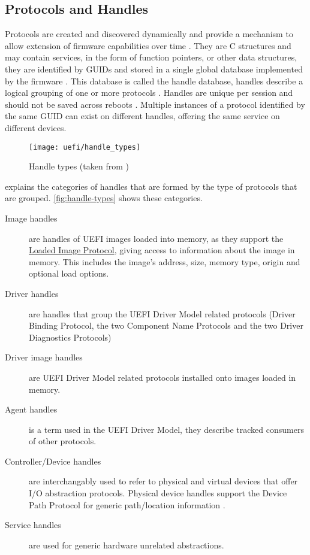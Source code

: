 \subsection{Protocols and Handles}

Protocols are created and discovered dynamically and provide a mechanism to allow extension of firmware capabilities over time \cite[Section 3.6]{tianocore-edk2-driver-writer-s-guide}.
They are C structures and may contain services, in the form of function pointers, or other data structures, they are identified by \acp{GUID} and stored in a single global database implemented by the firmware \cite{beyond-bios}.
This database is called the handle database, handles describe a logical grouping of one or more protocols \cite[Section 3.6]{tianocore-edk2-driver-writer-s-guide}.
Handles are unique per session and should not be saved across reboots \cite{beyond-bios}.
Multiple instances of a protocol identified by the same \ac{GUID} can exist on different handles, offering the same service on different devices.

\begin{figure}[htb]%
    \centering%
    \texttt{[image: uefi/handle\_types]}%
    \caption{Handle types (taken from \cite[Figure 3]{tianocore-edk2-driver-writer-s-guide})}%
    \label{fig:handle-types}%
\end{figure}

\cite{tianocore-edk2-driver-writer-s-guide} explains the categories of handles that are formed by the type of protocols that are grouped. \autoref{fig:handle-types} shows these categories.

\begin{description}
    \item[Image handles] are handles of \ac{UEFI} images loaded into memory, as they support the \hyperref[lst:loaded-image-protocol]{Loaded Image Protocol}, giving access to information about the image in memory. This includes the image's address, size, memory type, origin and optional load options.
    \item[Driver handles] are handles that group the \ac{UEFI} Driver Model related protocols (Driver Binding Protocol, the two Component Name Protocols and the two Driver Diagnostics Protocols)
    \item[Driver image handles] are \ac{UEFI} Driver Model related protocols installed onto images loaded in memory.
    \item[Agent handles] is a term used in the \ac{UEFI} Driver Model, they describe tracked consumers of other protocols.
    \item[Controller/Device handles] are interchangably used to refer to physical and virtual devices that offer \ac{I/O} abstraction protocols.
        Physical device handles support the Device Path Protocol for generic path/location information \cite[Section 10.2]{uefi-spec}.
    \item[Service handles] are used for generic hardware unrelated abstractions.
\end{description}

